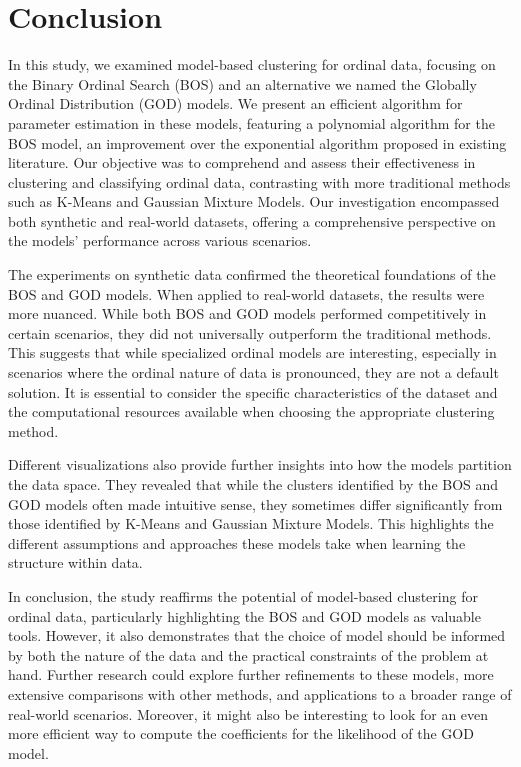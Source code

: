 \section{Conclusion}
In this study, we examined model-based clustering for ordinal data, focusing on the Binary Ordinal Search (BOS) and an alternative we named the Globally Ordinal Distribution (GOD) models.
We present an efficient algorithm for parameter estimation in these models, featuring a polynomial algorithm for the BOS model, an improvement over the exponential algorithm proposed in existing literature.
Our objective was to comprehend and assess their effectiveness in clustering and classifying ordinal data, contrasting with more traditional methods such as K-Means and Gaussian Mixture Models. Our investigation encompassed both synthetic and real-world datasets, offering a comprehensive perspective on the models' performance across various scenarios.

The experiments on synthetic data confirmed the theoretical foundations of the BOS and GOD models. 
When applied to real-world datasets, the results were more nuanced. While both BOS and GOD models performed competitively in certain scenarios, they did not universally outperform the traditional methods. This suggests that while specialized ordinal models are interesting, especially in scenarios where the ordinal nature of data is pronounced, they are not a default solution. It is essential to consider the specific characteristics of the dataset and the computational resources available when choosing the appropriate clustering method.

Different visualizations also provide further insights into how the models partition the data space. They revealed that while the clusters identified by the BOS and GOD models often made intuitive sense, they sometimes differ significantly from those identified by K-Means and Gaussian Mixture Models. This highlights the different assumptions and approaches these models take when learning the structure within data.

In conclusion, the study reaffirms the potential of model-based clustering for ordinal data, particularly highlighting the BOS and GOD models as valuable tools. However, it also demonstrates that the choice of model should be informed by both the nature of the data and the practical constraints of the problem at hand. Further research could explore further refinements to these models, more extensive comparisons with other methods, and applications to a broader range of real-world scenarios. Moreover, it might also be interesting to look for an even more efficient way to compute the coefficients for the likelihood of the GOD model.
